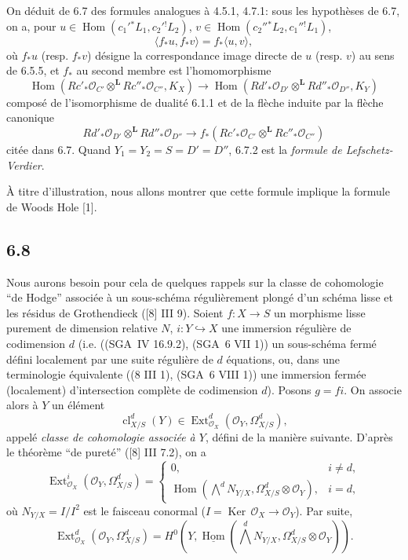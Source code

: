 \documentclass[11pt]{article}
\providecommand{\cO}{\mathcal{O}}
\DeclareMathOperator{\Hom}{Hom}
\DeclareMathOperator{\Ext}{Ext}
\providecommand{\Ker}{\operatorname{Ker}}
\providecommand{\cl}{\operatorname{cl}}
\providecommand{\Hom}{\operatorname{Hom}}
\providecommand{\Ker}{\operatorname{Ker}}
\providecommand{\Ker}{\operatorname{Ker}}
\begin{document}
On déduit de 6.7 des formules analogues à 4.5.1, 4.7.1: sous les hypothèses de 6.7, on a, pour $u\in\Hom(c_1'{}^*L_1,c_2'{}^!L_2)$, $v\in\Hom(c_2''{}^*L_2,c_1''{}^!L_1)$,
\begin{equation}
\tag{6.7.2}
\langle f_*u,f_*v\rangle=f_*\langle u,v\rangle,
\end{equation}
où $f_*u$ (resp. $f_*v$) désigne la correspondance image directe de $u$ (resp. $v$) au sens de 6.5.5, et $f_*$ au second membre est l'homomorphisme
\begin{equation}
\tag{6.7.3}
\Hom(Rc'_*\cO_{C'}\otimes^{\mathbf L}Rc''_*\cO_{C''},K_X)
\longrightarrow
\Hom(Rd'_*\cO_{D'}\otimes^{\mathbf L}Rd''_*\cO_{D''},K_Y)
\end{equation}
composé de l'isomorphisme de dualité 6.1.1 et de la flèche induite par la flèche canonique
\[
Rd'_*\cO_{D'}\otimes^{\mathbf L}Rd''_*\cO_{D''}\longrightarrow f_*(Rc'_*\cO_{C'}\otimes^{\mathbf L}Rc''_*\cO_{C''})
\]
citée dans 6.7. Quand $Y_1=Y_2=S=D'=D''$, 6.7.2 est la \emph{formule de Lefschetz-Verdier}.

À titre d'illustration, nous allons montrer que cette formule implique la formule de Woods Hole [1].

\subsection*{6.8}
Nous aurons besoin pour cela de quelques rappels sur la classe de cohomologie ``de Hodge'' associée à un sous-schéma régulièrement plongé d'un schéma lisse et les résidus de Grothendieck ([8] III 9). Soient $f:X\to S$ un morphisme lisse purement de dimension relative $N$, $i:Y\hookrightarrow X$ une immersion régulière de codimension $d$ (i.e. ((SGA~IV 16.9.2), (SGA~6 VII 1)) un sous-schéma fermé défini localement par une suite régulière de $d$ équations, ou, dans une terminologie équivalente ((8 III 1), (SGA~6 VIII 1)) une immersion fermée (localement) d'intersection complète de codimension $d$). Posons $g=fi$. On associe alors à $Y$ un élément
\begin{equation}
\tag{6.8.1}
\cl^d_{X/S}(Y)\in\Ext^d_{\cO_X}(\cO_Y,\Omega^d_{X/S}),
\end{equation}
appelé \emph{classe de cohomologie associée à $Y$}, défini de la manière suivante. D'après le théorème ``de pureté'' ([8] III 7.2), on a
\begin{equation}
\tag{6.8.2}
\Ext^i_{\cO_X}(\cO_Y,\Omega^d_{X/S})=
\begin{cases}
0,& i\ne d,\\
\Hom(\bigwedge^d N_{Y/X},\Omega^d_{X/S}\otimes\cO_Y),& i=d,
\end{cases}
\end{equation}
où $N_{Y/X}=I/I^2$ est le faisceau conormal ($I=\Ker\,\cO_X\to\cO_Y$). Par suite,
\begin{equation}
\tag{6.8.3}
\Ext^d_{\cO_X}(\cO_Y,\Omega^d_{X/S})=H^0(Y,\underline{\Hom}(\bigwedge^dN_{Y/X},\Omega^d_{X/S}\otimes\cO_Y)).
\end{equation}
\end{document}
